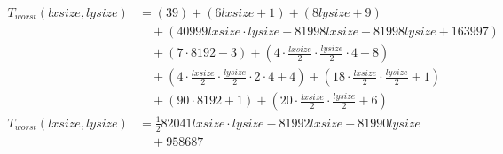 \begin{subequations}
\label{eq:analyse-arlabeling-all-2}
\begin{align}
\label{eq:analyse-arlabeling-all-2-1}
T_{worst}(\mathit{lxsize},\mathit{lysize})& =
 (39)
 + (6\mathit{lxsize} + 1)
 + (8\mathit{lysize} + 9)
\\
& \quad
 + (40999\mathit{lxsize} \cdot \mathit{lysize} - 81998\mathit{lxsize} - 81998\mathit{lysize} + 163997)
\nonumber \\
& \quad
 + (7 \cdot 8192 - 3)
 + (4 \cdot \frac{\mathit{lxsize}}{2} \cdot \frac{\mathit{lysize}}{2} \cdot 4 + 8)
\nonumber \\
& \quad
 + (4 \cdot \frac{\mathit{lxsize}}{2} \cdot \frac{\mathit{lysize}}{2} \cdot 2 \cdot 4 + 4)
 + (18 \cdot \frac{\mathit{lxsize}}{2} \cdot \frac{\mathit{lysize}}{2} + 1)
\nonumber \\
& \quad
 + (90 \cdot 8192 + 1)
 + (20 \cdot \frac{\mathit{lxsize}}{2} \cdot \frac{\mathit{lysize}}{2} + 6)
\nonumber \\
\label{eq:analyse-arlabeling-all-2-2}
T_{worst}(\mathit{lxsize},\mathit{lysize})& =
\frac{1}{2}82041\mathit{lxsize} \cdot \mathit{lysize} -81992\mathit{lxsize} -81990\mathit{lysize}
\\
& \quad
 + 958687
\nonumber
\end{align}	
\end{subequations}
